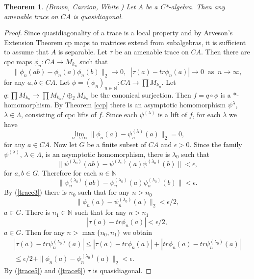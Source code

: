 \documentclass{article}%
\newtheorem{theorem}{Theorem}
\begin{document}
\begin{theorem}\label{QDtraceCone} (Brown, Carrion, White \cite[Prop. 3.2]{BCW})  Let $A$ be  a C*-algebra. Then any amenable trace on $CA$ is quasidiagonal.
\end{theorem}
\begin{proof} Since quasidiagonality of a trace  is a local property and by Arveson's Extension Theorem cp maps to matrices extend from subalgebras, it is sufficient to assume that $A$ is separable. Let $\tau$ be an amenable trace on $CA$. Then there are cpc maps $\phi_n: CA \to M_{k_n}$ such that
$$\|\phi_n(ab) - \phi_n(a)\phi_n(b)\|_2\to 0, \;\; |\tau(a)- tr \phi_n(a)|\to 0 \;\;\text{as} \;\;n\to \infty,$$
for any $a, b \in CA$.  Let $\phi = (\phi_n)_{n\in \mathbb N}: CA \to \prod M_{k_n}$.  Let  $q: \prod M_{k_n}\to \prod M_{k_n}/\oplus_2 M_{k_n}$ be the canonical surjection. Then
$f= q\circ \phi$ is a $\ast$-homomorphism. By Theorem \ref{ccp} there is an asymptotic homomorphism  $\psi^{\lambda}$, $\lambda\in \Lambda$, consisting of cpc lifts of $f$.
\noindent Since each $\psi^{(\lambda)}$ is a lift of $f$, for each $\lambda$ we have
\begin{equation}\label{trace3} \lim_{n\to \infty} \|\phi_n(a)- \psi_n^{(\lambda)}(a)\|_2 =0, \end{equation}
for any $a\in CA$.  Now let $G$ be a finite subset of $CA$ and $\epsilon > 0$. Since the family $\psi^{(\lambda)}$, $\lambda\in \Lambda$, is an asymptotic homomorphism, there is $\lambda_0$ such that
\begin{equation}\label{trace4} \|\psi^{(\lambda_0)}(ab) - \psi^{(\lambda_0)}(a)\psi^{(\lambda_0)}(b)\|< \epsilon, \end{equation} for $a, b \in G$.  Therefore for each $n\in \mathbb N$
\begin{equation}\label{trace5} \|\psi_n^{(\lambda_0)}(ab) - \psi_n^{(\lambda_0)}(a)\psi_n^{(\lambda_0)}(b)\|< \epsilon. \end{equation}
By (\ref{trace3}) there is $n_0$ such that for any $n>n_0$
$$\|\phi_n(a) - \psi_n^{(\lambda_0)}(a)\|_2< \epsilon/2, $$
$a\in G$. There is $n_1\in \mathbb N$ such that for any $n>n_1$
$$|\tau(a)- tr \phi_n(a)| < \epsilon/2,$$ $a\in G$. Then for any $n> \max\{n_0, n_1\}$ we obtain
\begin{multline}\label{trace6} |\tau(a) - tr \psi_n^{(\lambda_0)}(a)|\le |\tau(a) - tr \phi_n(a)| + | tr \phi_n(a) - tr \psi_n^{(\lambda_0)}(a)|\\ \le \epsilon/2 + \|\phi_n(a) - \psi_n^{(\lambda_0)}(a)\|_2 <\epsilon.\end{multline}
By (\ref{trace5}) and (\ref{trace6}) $\tau$ is quasidiagonal.
\end{proof}
\end{document}
